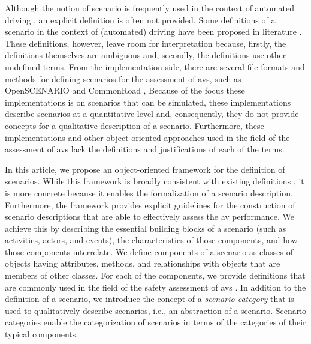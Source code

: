 Although the notion of scenario is frequently used in the context of automated driving \autocite{gietelink2006development, ebner2011identifying, hulshof2013autonomous, xiong2015orchestration, zofka2015datadrivetrafficscenarios, putz2017pegasus, roesener2017comprehensive, ploeg2017GCDC, shao2019evaluating}, an explicit definition is often not provided. \cendc
Some definitions of a scenario in the context of (automated) driving have been proposed in literature \autocite{geyer2014, ulbrich2015, elrofai2016scenario}.
These definitions, however, leave room for interpretation because, firstly, the definitions themselves are ambiguous and, secondly, the definitions use other undefined terms.
\cstartc From the implementation side, there are several file formats and methods for defining scenarios for the assessment of \acp{av}, such as OpenSCENARIO \autocite{openscenario} and CommonRoad \autocite{althoff2017CommonRoad},
Because of the focus these implementations is on scenarios that can be simulated, these implementations describe scenarios at a quantitative level and, consequently, they do not provide concepts for a qualitative description of a scenario.
Furthermore, these implementations and other object-oriented approaches used in the field of the assessment of \acp{av} \autocite{tsai2003scenario, utting2012taxonomy, zofka2016testing, wittmann2017method} lack the definitions and justifications of each of the terms.

In this article, we propose an object-oriented framework for the definition of scenarios. While this framework is broadly consistent with existing definitions \autocite{geyer2014, ulbrich2015, elrofai2016scenario}, it is more concrete because it enables the formalization of a scenario description. 
Furthermore, the framework provides explicit guidelines for the construction of scenario descriptions that are able to effectively assess the \ac{av} performance.
We achieve this by describing the essential building blocks of a scenario (such as activities, actors, and events), the characteristics of those components, and how those components interrelate. 
We define components of a scenario as classes of objects having attributes, methods, and relationships with objects that are members of other classes.
For each of the components, we provide definitions that are commonly used in the field of the safety assessment of \acp{av} \autocite{geyer2014, ulbrich2015, catapult2018musicc, catapult2018regulating, sigsim2019glossary, openscenario}. 
In addition to the definition of a scenario, we introduce the concept of a \emph{scenario category} that is used to qualitatively describe scenarios, i.e., an abstraction of a scenario. Scenario categories enable the categorization of scenarios in terms of the categories of their typical components.

